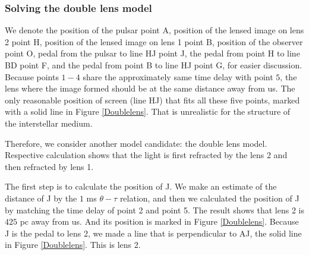 \documentclass[useAMS,usenatbib]{mn2e}
\begin{document}
\subsubsection{Solving the double lens model}
We denote the position of the pulsar point A, position of the lensed image on lens 2 point H, position of the lensed image on lens 1 point B, position of the observer point O, pedal from the pulsar to line HJ point J, the pedal from point H to line BD point F, and the pedal from point B to line HJ point G, for easier discussion.
Because points $1-4$ share the approximately same time delay with point $5$, the lens where the image formed should be at the same distance away from us. The only reasonable position of screen (line HJ) that fits all these five points, marked with a solid line in Figure \ref{Doublelens}.  
That is unrealistic for the structure of the interstellar medium. 

Therefore, we consider another model candidate: the double lens model. Respective calculation shows that the light is first refracted by the lens 2 and then refracted by lens 1. 

The first step is to calculate the position of J. We make an estimate of the distance of J by the $1$ ms $\theta-\tau$ relation, and then we calculated the position of J by matching the time delay of point 2 and point 5. The result shows that lens 2 is $425$ pc away from us. And its position is marked in Figure \ref{Doublelens}. Because J is the pedal to lens 2, we made a line that is perpendicular to AJ, the solid line in Figure \ref{Doublelens}. This is lens 2.
\end{document}
